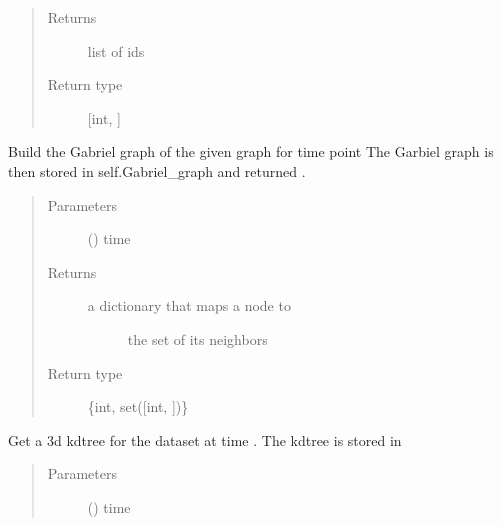 \documentclass[letterpaper,10pt,english]{sphinxmanual}
\begin{document}
\begin{fulllineitems}
\begin{fulllineitems}
\begin{quote}
\begin{description}
\begin{itemize}
\end{itemize}

\item[{Returns}] \leavevmode
list of ids

\item[{Return type}] \leavevmode
{[}int, {]}

\end{description}\end{quote}

\end{fulllineitems}


\begin{fulllineitems}
\label{\detokenize{index:LineageTree.lineageTree.get_gabriel_graph}}
Build the Gabriel graph of the given graph for time point 
The Garbiel graph is then stored in self.Gabriel\_graph and returned
.
\begin{quote}\begin{description}
\item[{Parameters}] \leavevmode
{} () \textendash{} time

\item[{Returns}] \leavevmode
\begin{description}
\item[{a dictionary that maps a node to}] \leavevmode
the set of its neighbors

\end{description}


\item[{Return type}] \leavevmode
\{int, set({[}int, {]})\}

\end{description}\end{quote}

\end{fulllineitems}


\begin{fulllineitems}
\label{\detokenize{index:LineageTree.lineageTree.get_idx3d}}
Get a 3d kdtree for the dataset at time  .
The  kdtree is stored in 
\begin{quote}\begin{description}
\item[{Parameters}] \leavevmode
{} () \textendash{} time


\end{description}
\end{quote}
\end{fulllineitems}
\end{fulllineitems}
\end{document}

